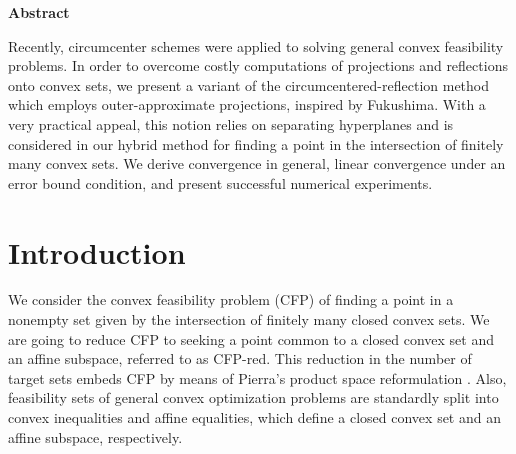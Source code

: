 \documentclass[smallextended,numbook,nospthms]{svjour3}
\theoremstyle{plain}
\theoremstyle{definition}
\def\RR{\mathds R}
\begin{document}


\thispagestyle{empty}

\newpage
\begin{center}
\textbf{\normalsize Abstract}
\end{center}
\vspace{1pt}

Recently, circumcenter schemes were  applied to solving general convex feasibility problems. In order to overcome costly computations of projections and reflections onto convex sets, we present a variant of the circumcentered-reflection method which employs outer-approximate projections, inspired by Fukushima.
With a very practical appeal, this  notion relies on separating hyperplanes and is considered in our hybrid method for finding a point in the intersection of finitely many convex sets.  We derive convergence in general, linear convergence under an error bound condition, and present successful numerical experiments.

\newpage
\thispagestyle{empty}

\listoffigures

\listoftables

\newpage

\thispagestyle{empty}

\newpage
\tableofcontents
\thispagestyle{empty}

\newpage
\section{Introduction}
We consider the convex feasibility problem (CFP) of finding a point in a nonempty set given by the intersection of finitely many closed convex sets. We are going to reduce CFP to seeking a point common to a closed convex set and an affine subspace, referred to as CFP-red. This reduction in the number of target sets embeds CFP by means of Pierra's product space reformulation \cite{Pierra:1984hl}. Also, feasibility sets of general convex optimization problems are standardly split into convex inequalities and affine equalities, which define a closed convex set and an affine subspace, respectively.

\end{document}
